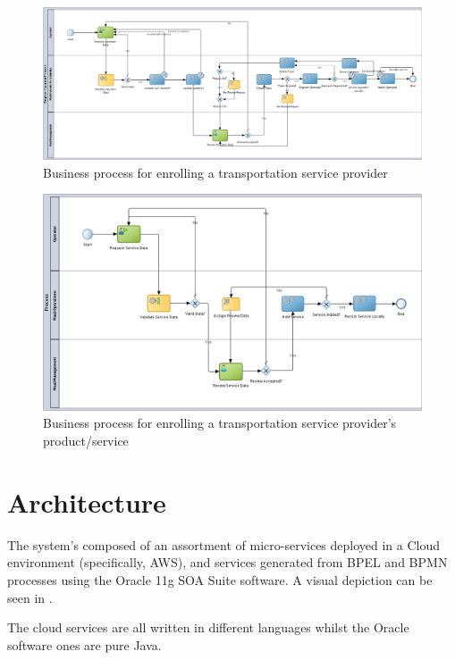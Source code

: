 \documentclass[runningheads,a4]{llncs}
\begin{document}
\begin{figure}
  \centering
  \includegraphics[width=\textwidth]{img/bpm-operator.png}
  \caption{Business process for enrolling a transportation service provider}
  \label{fig:bpm.operator}
\end{figure}
\begin{figure}
  \centering
  \includegraphics[width=\textwidth]{img/bpm-service.png}
  \caption{Business process for enrolling a transportation service provider's
    product/service}
  \label{fig:bpm.service}
\end{figure}


\section{Architecture}
\label{sec:architecture}
The system's composed of an assortment of micro-services deployed in a Cloud
environment (specifically, \ac{AWS}), and services generated from \ac{BPEL} and
\ac{BPMN} processes using the Oracle 11g \ac{SOA} Suite software. A visual
depiction can be seen in .

The cloud services are all written in different languages whilst the Oracle
software ones are pure Java.
\end{document}

